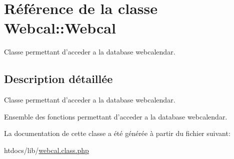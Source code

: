 \hypertarget{classWebcal_1_1Webcal}{
\section{R\'{e}f\'{e}rence de la classe Webcal::Webcal}
\label{classWebcal_1_1Webcal}
}
Classe permettant d'acceder a la database webcalendar.  




\subsection{Description d\'{e}taill\'{e}e}
Classe permettant d'acceder a la database webcalendar. 

Ensemble des fonctions permettant d'acceder a la database webcalendar. 



La documentation de cette classe a \'{e}t\'{e} g\'{e}n\'{e}r\'{e}e \`{a} partir du fichier suivant:\begin{CompactItemize}
\item 
htdocs/lib/\hyperlink{webcal_8class_8php}{webcal.class.php}\end{CompactItemize}

